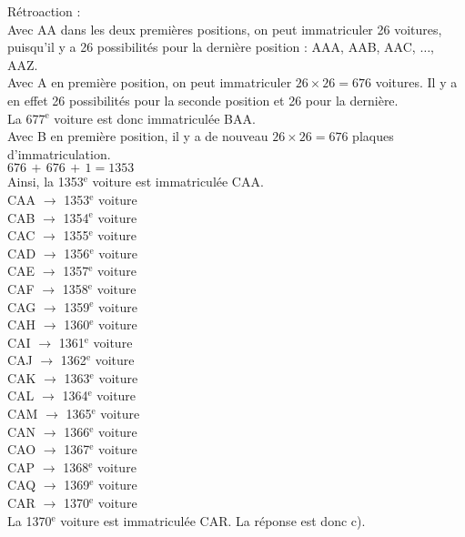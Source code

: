 ﻿\documentclass[letterpaper, 12pt]{article}
\begin{document}
R\'etroaction : \\
Avec AA dans les deux premi\`eres positions, on peut immatriculer 26
voitures, puisqu'il y a 26 possibilit\'es pour la derni\`ere position : AAA,
AAB, AAC, $\ldots$, AAZ.\\
Avec A en premi\`ere position, on peut immatriculer $26\times26=676$
voitures. Il y a en effet 26 possibilit\'es pour la seconde position et 26
pour la derni\`ere.  \\
La 677$^{\textrm{e}}$ voiture est donc immatricul\'ee BAA.\\
Avec B en premi\`ere position, il y a de nouveau $26\times26=676$ plaques
d'immatriculation.\\
$676\,+\,676\,+\,1=1353$\\
Ainsi, la 1353$^{\textrm{e}}$ voiture est immatricul\'ee CAA.\\
CAA $\longrightarrow$ 1353$^{\textrm{e}}$ voiture\\
CAB $\longrightarrow$ 1354$^{\textrm{e}}$ voiture\\
CAC $\longrightarrow$ 1355$^{\textrm{e}}$ voiture\\
CAD $\longrightarrow$ 1356$^{\textrm{e}}$ voiture\\
CAE $\longrightarrow$ 1357$^{\textrm{e}}$ voiture\\
CAF $\longrightarrow$ 1358$^{\textrm{e}}$ voiture\\
CAG $\longrightarrow$ 1359$^{\textrm{e}}$ voiture\\
CAH $\longrightarrow$ 1360$^{\textrm{e}}$ voiture \\
CAI $\longrightarrow$ 1361$^{\textrm{e}}$ voiture\\
CAJ $\longrightarrow$ 1362$^{\textrm{e}}$ voiture\\
CAK $\longrightarrow$ 1363$^{\textrm{e}}$ voiture\\
CAL $\longrightarrow$ 1364$^{\textrm{e}}$ voiture\\
CAM $\longrightarrow$ 1365$^{\textrm{e}}$ voiture\\
CAN $\longrightarrow$ 1366$^{\textrm{e}}$ voiture\\
CAO $\longrightarrow$ 1367$^{\textrm{e}}$ voiture\\
CAP $\longrightarrow$ 1368$^{\textrm{e}}$ voiture\\
CAQ $\longrightarrow$ 1369$^{\textrm{e}}$ voiture\\
CAR $\longrightarrow$ 1370$^{\textrm{e}}$ voiture\\
La 1370$^{\textrm{e}}$ voiture est immatricul\'ee CAR. La r\'eponse est donc
c).\\
\end{document}
